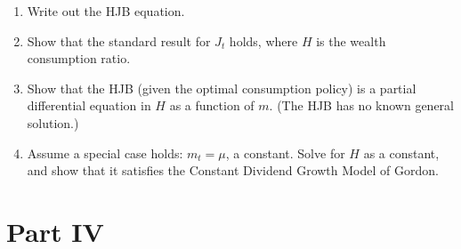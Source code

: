 \documentclass{article}
\begin{document}
\begin{itemize}
\begin{enumerate}

\item Write out the HJB equation.

\item Show that the standard result for $J_t$ holds, where $H$ is the wealth consumption ratio.

\item Show that the HJB (given the optimal consumption policy) is a partial differential equation in $H$ as a function of $m$. (The HJB has no known general solution.)

\item Assume a special case holds: $m_t = \mu$, a constant. Solve for $H$ as a constant, and show that it satisfies the Constant Dividend Growth Model of Gordon.

\end{enumerate}

\end{itemize}


\section{Part IV}
\end{document}
